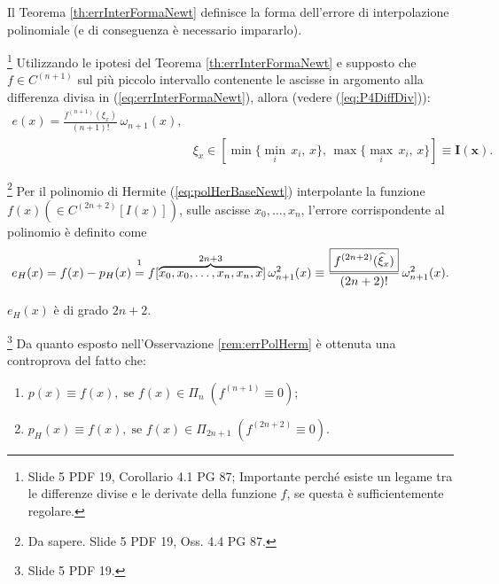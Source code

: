 
\begin{remark}
    Il Teorema \ref{th:errInterFormaNewt} definisce la forma dell'errore di interpolazione polinomiale (e di conseguenza è necessario impararlo).
\end{remark}

\begin{corollary}
    \footnote{Slide 5 PDF 19, Corollario 4.1 PG 87; Importante perché esiste un legame tra le differenze divise e le derivate della funzione $f$, se questa è sufficientemente regolare.}
    Utilizzando le ipotesi del Teorema \ref{th:errInterFormaNewt} e supposto che $f\in C^{(n+1)}$ sul più piccolo intervallo contenente le ascisse in argomento alla differenza divisa in (\ref{eq:errInterFormaNewt}), allora (vedere (\ref{eq:P4DiffDiv})):
    \begin{equation}\label{eq:errInterP4}
        \begin{matrix}
            e(x)=\frac{f^{(n+1)}(\xi_x)}{(n+1)!}\,\omega_{n+1}(x),&\\
            &\xi_x\in[\min\{\underset{i}{\min}\,x_i,\,x\},\, \max\{\underset{i}{\max}\,x_i,\, x\}]\boldsymbol{\equiv I(x)}.
        \end{matrix}
    \end{equation}
\end{corollary}

\begin{remark}\label{rem:errPolHerm}
    \footnote{Da sapere. Slide 5 PDF 19, Oss. 4.4 PG 87.}
    Per il polinomio di Hermite (\ref{eq:polHerBaseNewt}) interpolante la funzione $f(x)\left(\in C^{(2n+2)}[I(x)]\right)$, sulle ascisse $x_0,\hdots,x_n$, l'errore corrispondente al polinomio è definito come
    \begin{equation}\label{eq:errPolInterHer}
        e_H(x)= f(x)-p_H(x) \overset{\footnotemark}{=} f[\overbrace{x_0,x_0,\hdots,x_n,x_n,x}^{2n+3}]\,\omega^2_{n+1}(x)\equiv\frac{\boxed{f^{(2n+2)}(\widehat\xi_x)}}{(2n+2)!}\,\omega^2_{n+1}(x).
    \end{equation}
\end{remark}
$e_H(x)$ è di grado $2n+2$.

\begin{remark}\footnote{Slide 5 PDF 19.}
    Da quanto esposto nell'Osservazione \ref{rem:errPolHerm} è ottenuta una controprova del fatto che:
    \begin{enumerate}
        \item $p(x)\equiv f(x),\; \text{se } f(x)\in\Pi_n\; \left(f^{(n+1)}\equiv 0\right)$;
        \item $p_H(x)\equiv f(x),\; \text{se } f(x)\in\Pi_{2n+1}\; \left(f^{(2n+2)}\equiv 0\right)$.
    \end{enumerate}
\end{remark}

